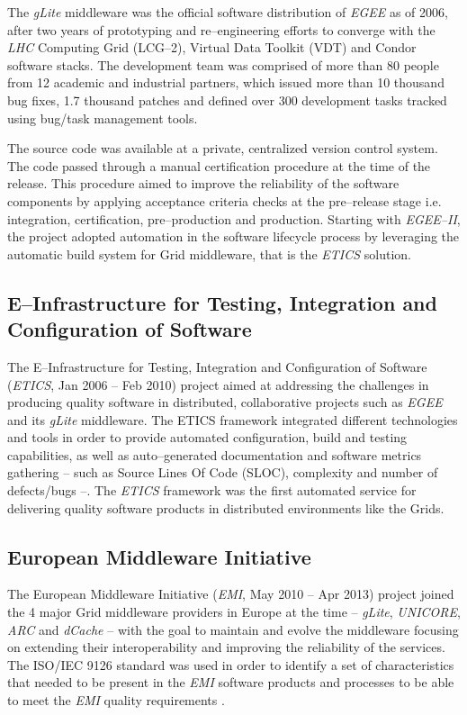 The {\sl gLite} middleware \cite{glite} was the
official software distribution of {\sl EGEE} as of 2006, after two years of prototyping and
re--engineering efforts to converge with the {\sl LHC} Computing Grid (LCG--2), Virtual
Data Toolkit (VDT) and Condor \cite{condor} software stacks. The
development team was comprised of more than 80 people from 12 academic and
industrial partners, which issued more than 10 thousand bug fixes, 1.7 thousand patches and
defined over 300 development tasks tracked using bug/task management tools.

The source code was available at a private, centralized version control system.
The code passed through a manual certification procedure at the time of the release.
This procedure aimed to improve the reliability of the software components by applying
acceptance criteria checks at the pre--release stage
\cite{egee:acceptance-criteria} i.e. integration, certification, pre--production and
production. Starting with {\sl EGEE--II}, the project adopted automation in the software
lifecycle process by leveraging the automatic build system for Grid middleware, that is
the {\sl ETICS} \cite{etics} solution.

\subsection{E--Infrastructure for Testing, Integration and Configuration of Software}

The E--Infrastructure for Testing, Integration and Configuration of Software~\cite{etics}
({\sl ETICS}, Jan 2006 -- Feb 2010) project aimed
at addressing the challenges in producing quality software in distributed,
collaborative projects such as {\sl EGEE} and its {\sl gLite} middleware. The ETICS framework
integrated different technologies and tools in order to provide automated configuration,
build and testing capabilities, as well as auto--generated documentation and
software metrics gathering -- such as Source Lines Of Code (SLOC), complexity and
number of defects/bugs \cite{etics} --. The {\sl ETICS} framework was the first automated
service for delivering quality software products in distributed environments like
the Grids.

\subsection{European Middleware Initiative}

The European Middleware Initiative ({\sl EMI}, May 2010 -- Apr 2013)
\cite{cordis:emi} project joined the 4 major Grid middleware providers in
Europe at the time -- {\sl gLite}, {\sl UNICORE}, {\sl ARC} and {\sl dCache} --
with the goal to maintain and evolve the middleware focusing on extending their interoperability and improving the reliability of the services. The
ISO/IEC 9126 \cite{iso-9126} standard was used in order to identify a set of
characteristics that needed to be present in the {\sl EMI} software products and
processes to be able to meet the {\sl EMI} quality requirements
\cite{emi-quality-model}.

